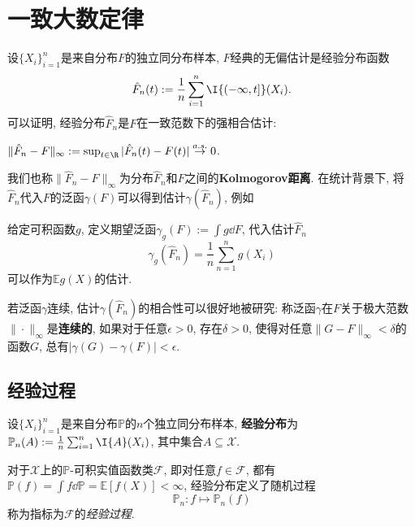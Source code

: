 \section{一致大数定律}
 
设$\{X_i\}_{i=1}^n$是来自分布$F$的独立同分布样本, $F$经典的无偏估计是经验分布函数
\begin{equation*}
	\hat F_n(t) := \frac{1}{n} \sum_{i=1}^n \I{(-\infty, t]}(X_i). 
\end{equation*}
可以证明, 经验分布$\hat F_n$是$F$在一致范数下的强相合估计: 
\begin{theorem}\label{thm:Glivenko-Cantelli}
	$\|\hat F_n - F\|_{\infty} := \sup_{t \in \R} |\hat F_n(t) - F(t)| \stackrel{a.s.}{\to} 0$. 
\end{theorem}
我们也称$\|\hat F_n - F\|_{\infty}$为分布$\hat F_n$和$F$之间的\textbf{Kolmogorov距离}. 
在统计背景下,  将$\hat F_n$代入$F$的泛函$\gamma(F)$可以得到估计$\gamma(\hat F_n)$, 例如

\begin{example}
	给定可积函数$g$, 定义期望泛函$\gamma_g(F) := \int g \dd F$, 代入估计$\hat F_n$
	\begin{equation*}
		\gamma_g(\hat F_n) = \frac{1}{n} \sum_{n=1}^n g(X_i)
	\end{equation*}
	可以作为$\mathbb{E} g(X)$的估计. 
\end{example}

若泛函$\gamma$连续, 估计$\gamma(\hat F_n)$的相合性可以很好地被研究: 称泛函$\gamma$在$F$关于极大范数$\| \cdot \|_{\infty}$是\textbf{连续的}, 如果对于任意$\epsilon > 0$, 存在$\delta > 0$, 使得对任意$\|G - F\|_{\infty} < \delta$的函数$G$, 总有$|\gamma(G) - \gamma(F)| < \epsilon$. 


\subsection{经验过程}

设$\{X_i\}_{i=1}^n$是来自分布$\mathbb{P}$的$n$个独立同分布样本, \textbf{经验分布}为$\mathbb{P}_n(A) := \frac{1}{n} \sum_{i=1}^n \I{A}(X_i)$, 其中集合$A \subseteq \mathcal{X}$. 

对于$\mathcal{X}$上的$\mathbb{P}$-可积实值函数类$\mathscr{F}$, 即对任意$f \in \mathscr{F}$, 都有$\mathbb{P}(f) = \int f \dd \mathbb{P} = \mathbb{E}[f(X)] < \infty$, 经验分布定义了随机过程
\begin{equation*}
	\mathbb{P}_n \colon f \mapsto \mathbb{P}_n(f) 
\end{equation*}
称为指标为$\mathscr{F}$的\emph{经验过程}. 

